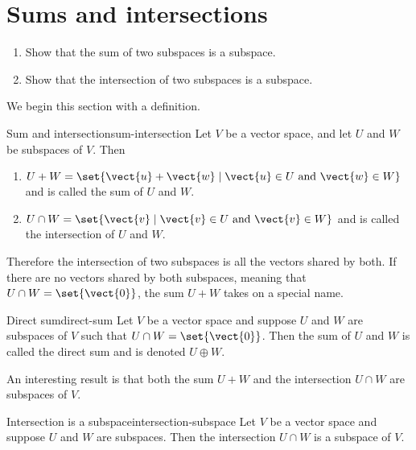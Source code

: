 \section{Sums and intersections}

\begin{outcome}
  \begin{enumerate}
  \item Show that the sum of two subspaces is a subspace.
  \item Show that the intersection of two subspaces is a subspace.
  \end{enumerate}
\end{outcome}

We begin this section with a definition.

\begin{definition}{Sum and intersection}{sum-intersection}
Let $V$ be a vector space, and let $U$ and $W$ be subspaces of
$V$.
Then
\begin{enumerate}
\item $U+W = \set{\vect{u}+\vect{w} \mid \vect{u}\in U\mbox{ and } \vect{w}\in W}$ and is
called the sum of $U$ and $W$.

\item $U\cap W = \set{\vect{v} \mid \vect{v}\in U\mbox{ and } \vect{v}\in W}$ and is
called the intersection of $U$ and $W$.
\end{enumerate}
\end{definition}

Therefore the intersection of two subspaces is all the vectors shared by both. If there are no vectors shared by both subspaces, meaning that $U \cap W = \set{\vect{0} }$, the sum $U+W$ takes on a special name.

\begin{definition}{Direct sum}{direct-sum}
Let $V$ be a vector space and suppose $U$ and $W$ are subspaces of $V$ such that  $U \cap W = \set{\vect{0} }$. Then the sum of $U$ and $W$ is called the direct sum and is denoted $U \oplus W$.
\end{definition}

An interesting result is that both the sum $U + W$ and the intersection $U \cap W$ are subspaces of $V$.

\begin{example}{Intersection is a subspace}{intersection-subspace}
Let $V$ be a vector space and suppose $U$ and $W$ are subspaces. Then the intersection $U \cap W$ is a subspace of $V$.
\end{example}

